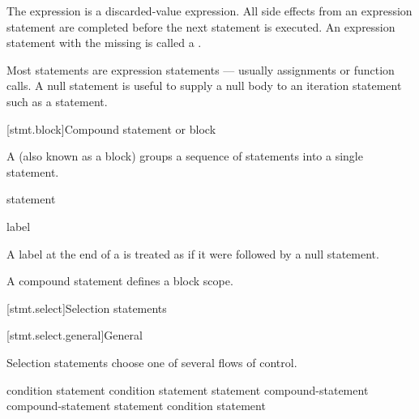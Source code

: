 The expression is
a discarded-value expression.
All
%
side effects from an expression statement
are completed before the next statement is executed.
%
An expression statement with the  missing is called
a .
\begin{note}
Most statements are expression statements --- usually assignments or
function calls. A null statement is useful to supply a null body to an
iteration statement such as a 
statement.
\end{note}

[stmt.block]{Compound statement or block}%
%

\pnum
A  (also known as a block) groups a
sequence of statements into a single statement.

\begin{bnf}
\br
    \terminal{\{}   \terminal{\}}
\end{bnf}

\begin{bnf}
\br
    statement 
\end{bnf}

\begin{bnf}
\br
    label 
\end{bnf}

A label at the end of a 
is treated as if it were followed by a null statement.

\pnum
\begin{note}
A compound statement defines a block scope.
\end{note}

[stmt.select]{Selection statements}%

[stmt.select.general]{General}%

\pnum
Selection statements choose one of several flows of control.

%
%
%
\begin{bnf}
\br
      \terminal{(}  condition \terminal{)} statement\br
      \terminal{(}  condition \terminal{)} statement  statement\br
     \opt{\terminal{!}}  compound-statement\br
     \opt{\terminal{!}}  compound-statement  statement\br
     \terminal{(}  condition \terminal{)} statement
\end{bnf}

